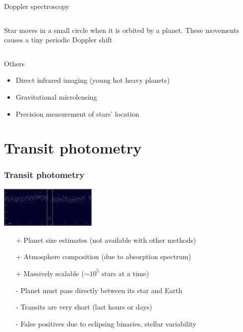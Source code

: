 \documentclass{beamer}
\begin{document}
\begin{frame}
\begin{block}{Doppler spectroscopy}
\begin{columns}[T]
Star moves in a small circle when it is orbited by a planet. These movements causes
a tiny periodic Doppler shift 
\end{columns}
\end{block}
\begin{block}{Others}
\begin{itemize}
\item Direct infrared imaging (young hot heavy planets)
\item Gravitational microlensing
\item Precision measurement of stars' location
\end{itemize}
\end{block}
\end{frame}

\section{Transit photometry}
\begin{frame}
\frametitle{Transit photometry}

\includegraphics[width=0.35\textwidth]{img/zooniverse.org/obvious_transit.png}

\begin{itemize}
\item[+] Planet size estimates (not available with other methods)
\item[+] Atmosphere composition (due to absorption spectrum)
\item[+] Massively scalable ($\sim 10^5$ stars at a time)
\item[-] Planet must pass directly between its star and Earth
\item[-] Transits are very short (last hours or days)
\item[-] False positives due to eclipsing binaries, stellar variability
\end{itemize}
\end{frame}
\end{document}
